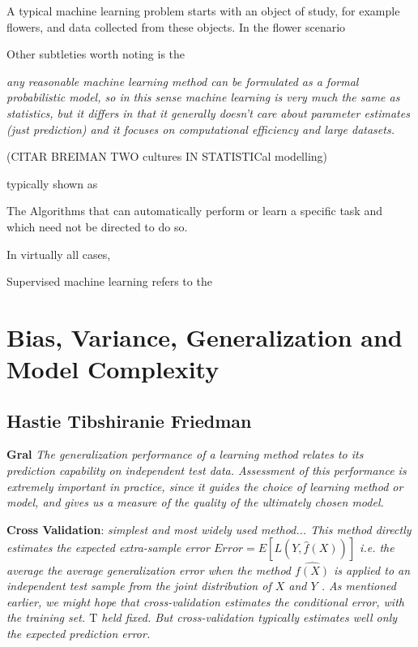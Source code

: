 A typical machine learning problem starts with an object of study, for example flowers, and data collected from these objects. In the flower scenario 

Other subtleties worth noting is the 

\textit{any reasonable machine learning method can be formulated as a formal probabilistic model, so in this sense machine learning is very much the same as statistics, but it differs in that it generally doesn't care about parameter estimates (just prediction) and it focuses on computational efficiency and large datasets.}

(CITAR BREIMAN TWO cultures IN STATISTICal modelling)

typically shown as 





The 
Algorithms that can automatically perform or learn a specific task and which need not be directed to do so. 



In virtually all cases, 

Supervised machine learning refers to the 


\subsection{}
\section{Bias, Variance, Generalization and Model Complexity}

\subsection{Hastie Tibshiranie Friedman}

\textbf{Gral}
\textit{The generalization performance of a learning method relates to its prediction capability on independent test data. Assessment of this performance is extremely important in practice, since it guides the choice of learning method or model, and gives us a measure of the quality of the ultimately chosen model.}

\textbf{Cross Validation}:  
\textit{simplest and most widely used method... This method directly estimates the expected extra-sample error
$Error = E[L(Y,\hat{f}(X))] $ i.e. the average the average generalization error when the method $\hat{f(X)}$ is applied to an independent test sample from the joint distribution of $X$ and $Y$ . As mentioned earlier, we might hope that cross-validation estimates the conditional error, with the training set. $\mathrm{T}$ held fixed. But cross-validation typically estimates well only the expected prediction error.}

